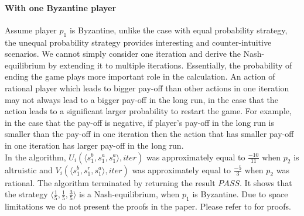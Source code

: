 \paragraph{With one Byzantine player}
Assume player $p_1$ is Byzantine, unlike the case with equal probability strategy,
the unequal probability strategy provides interesting and counter-intuitive scenarios.
We cannot simply consider one iteration and derive the Nash-equilibrium by extending it to multiple iterations.
Essentially, the probability of ending the game plays more important role in the calculation. An action of rational player which leads to bigger pay-off than other actions in one iteration may not always lead to a bigger pay-off in the long run, in the case that the action leads to a significant larger probability to restart the game. For example, in the case that the pay-off is negative, if player's pay-off in the long run is smaller than the pay-off in one iteration then the action that has smaller pay-off in one iteration has larger pay-off in the long run.\\
In the algorithm, $U_i(\langle s_1^b,s_1^a,s_1^a  \rangle,iter)$ was approximately equal to $\frac{-10}{11}$ when $p_2$ is altruistic and $V_i(\langle s_1^b,s_1^r,s_1^a \rangle,iter)$ was approximately equal to $\frac{-5}{3}$ when $p_2$ was rational. The algorithm terminated by returning the result $PASS$. It shows that the strategy  $\langle \frac{1}{5},\frac{1}{5},\frac{3}{5} \rangle$ is a Nash-equilibrium, when $p_1$ is Byzantine. Due to space limitations we do not present the proofs in the paper. Please refer to \cite{Full-version} for proofs.



